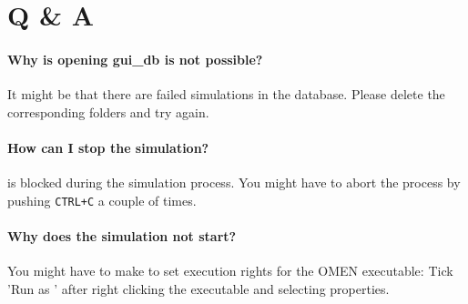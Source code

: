 	\section{Q \& A}
		\paragraph{Why is opening gui\_db is not possible?} It might be that there are failed simulations in the
		database. Please delete the corresponding folders and try again.
		
		\paragraph{How can I stop the simulation?} \matlab is blocked during
			the simulation process. You might have to abort the process by pushing \lstinline{CTRL+C}
			a couple of times.
		
		\paragraph{Why does the simulation not start?}
			You might have to make to set execution rights for the OMEN executable: Tick 'Run as ' after right clicking
			the \omen executable and selecting properties.